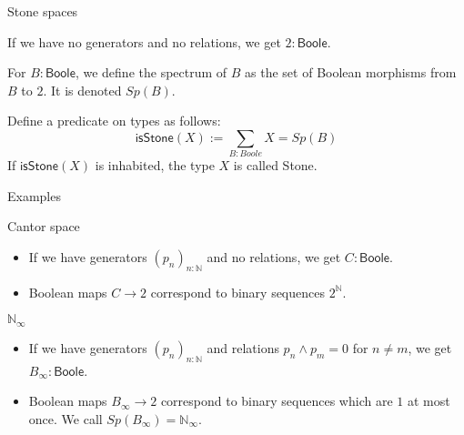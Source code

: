 \documentclass{beamer}
\newcommand{\Boole}{\mathsf{Boole}}
\newcommand{\isSt}{\mathsf{isStone}}
\begin{document}
\begin{frame}{Stone spaces}
  \begin{example}
    If we have no generators and no relations, we get $2:\Boole$.
  \end{example}
  \pause
\begin{definition}
  For $B:\Boole$, we define the spectrum of $B$ as 
  the set of Boolean morphisms from $B$ to $2$. 
  It is denoted $Sp(B)$.
\end{definition}
\pause
\begin{definition}
  Define a predicate on types as follows:
  \pause
  \begin{equation*}
    \isSt(X) := \sum\limits_{B : Boole} X = Sp(B)
  \end{equation*} 
  \pause 
  If $\isSt(X)$ is inhabited, the type $X$ is called Stone.
\end{definition}
\end{frame}

\begin{frame}{Examples}
  \begin{exampleblock}{Cantor space}
    \begin{itemize}
      \item 
        If we have generators $(p_n)_{n:\mathbb N}$ 
        and no relations, we get $C : \Boole$.
    \pause
  \item 
    Boolean maps $C \to 2$ correspond to \pause binary sequences $2^\mathbb N$.
    \end{itemize}
  \end{exampleblock}
  \pause
  \begin{exampleblock}{$\mathbb N_\infty$}
    \begin{itemize}
      \item 
    If we have generators $(p_n)_{n:\mathbb N}$ \pause 
    and relations $p_n \wedge p_m = 0$ for 
    $n \neq m$, we get $B_\infty:\Boole$. 
    \item 
    \pause
    Boolean maps $B_\infty \to 2$ correspond to \pause 
    binary sequences \pause which are $1$ at most once.
    \pause
    We call $Sp(B_\infty) = \mathbb N_\infty$. 
    \end{itemize}
  \end{exampleblock}
\end{frame}
\end{document}
